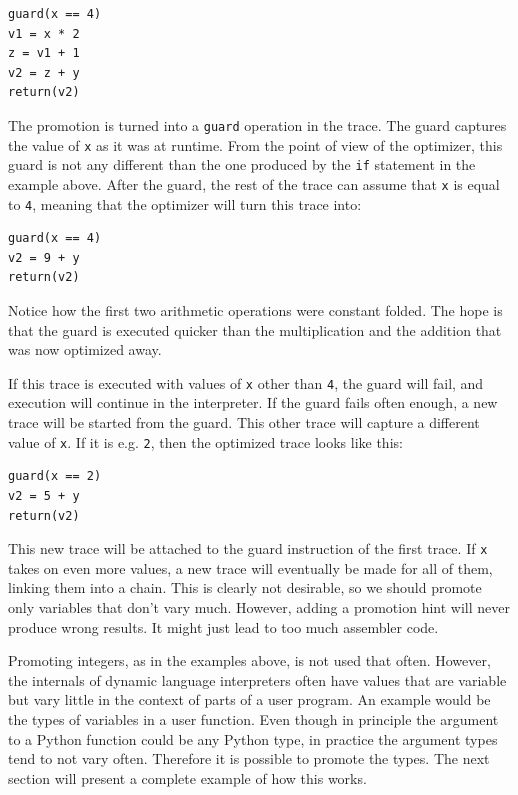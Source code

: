 \documentclass{sigplanconf}
\begin{document}
\begin{lstlisting}[mathescape,basicstyle=\ttfamily]
guard(x == 4)
v1 = x * 2
z = v1 + 1
v2 = z + y
return(v2)
\end{lstlisting}

The promotion is turned into a \texttt{guard} operation in the trace. The guard
captures the value of \texttt{x} as it was at runtime. From the point of view of the
optimizer, this guard is not any different than the one produced by the \texttt{if}
statement in the example above. After the guard, the rest of the trace can
assume that \texttt{x} is equal to \texttt{4}, meaning that the optimizer will turn this
trace into:

\begin{lstlisting}[mathescape,basicstyle=\ttfamily]
guard(x == 4)
v2 = 9 + y
return(v2)
\end{lstlisting}

Notice how the first two arithmetic operations were constant folded. The hope is
that the guard is executed quicker than the multiplication and the addition that
was now optimized away.

If this trace is executed with values of \texttt{x} other than \texttt{4}, the guard will
fail, and execution will continue in the interpreter. If the guard fails often
enough, a new trace will be started from the guard. This other trace will
capture a different value of \texttt{x}. If it is e.g. \texttt{2}, then the optimized
trace looks like this:

\begin{lstlisting}[mathescape,basicstyle=\ttfamily]
guard(x == 2)
v2 = 5 + y
return(v2)
\end{lstlisting}

This new trace will be attached to the guard instruction of the first trace. If
\texttt{x} takes on even more values, a new trace will eventually be made for all of them,
linking them into a chain. This is clearly not desirable, so we should promote
only variables that don't vary much. However, adding a promotion hint will never produce wrong
results. It might just lead to too much assembler code.

Promoting integers, as in the examples above, is not used that often.
However, the internals of dynamic language interpreters often
have values that are variable but vary little in the context of parts of a user
program. An example would be the types of variables in a user function. Even
though in principle the argument to a Python function could be any Python type,
in practice the argument types tend to not vary often. Therefore it is possible to
promote the types. The next section will present a complete example of how
this works.
\end{document}
